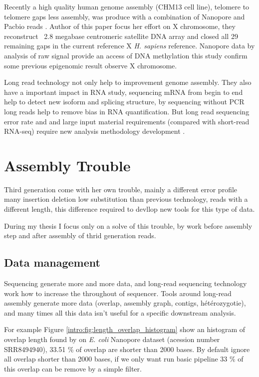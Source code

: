 \documentclass[./main.tex]{subfiles}
\begin{document}
Recently a high quality human genome assembly (CHM13 cell line), telomere to telomere gaps less assembly, was produce with a combination of Nanopore and Pacbio reads \cite{telomere2telomere}. Author of this paper focus her effort on X chromosome, they reconstruct ~2.8 megabase centromeric satellite DNA array and closed all 29 remaining gaps in the current reference X \textit{H. sapiens} reference. Nanopore data by analysis of raw signal provide an access of DNA methylation this study confirm some previous epigenomic result observe X chromosome.

Long read technology not only help to improvement genome assembly. They also have a important impact in RNA study, sequencing mRNA from begin to end help to detect new isoform and splicing structure, by sequencing without PCR long reads help to remove bias in RNA quantification. But long read sequencing error rate and and large input material requirements (compared with short-read RNA-seq) require new analysis methodology development \cite{review_lr_rna}. 

\section{Assembly Trouble}

Third generation come with her own trouble, mainly a different error profile many insertion deletion low substitution than previous technology, reads with a different length, this difference required to devllop new tools for this type of data.

During my thesis I focus only on a solve of this trouble, by work before assembly step and after assembly of thrid generation reads.

\subsection{Data management}

Sequencing generate more and more data, and long-read sequencing technology work how to increase the throughout of sequencer. Tools around long-read assembly generate more data (overlap, assembly graph, contigs, hétérozygotie), and many times all this data isn't useful for a specific downstream analysis.

For example Figure \ref{intro:fig:length_overlap_histogram} show an histogram of overlap length found by \minimap on \textit{E. coli} Nanopore dataset (acession number SRR8494940), 33.51 \% of overlap are shorter than 2000 bases. By default \miniasm ignore all overlap shorter than 2000 bases, if we only want run basic \miniasm pipeline 33 \% of this overlap can be remove by a simple filter. 
\end{document}
